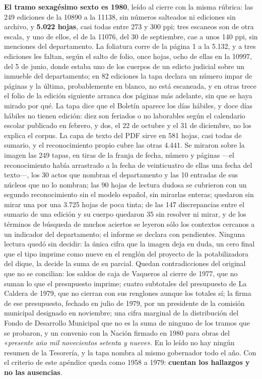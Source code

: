 \textbf{El tramo sexagésimo sexto es 1980}, leído al cierre con la misma rúbrica: las 249 ediciones de la 10890 a la 11138, sin números salteados ni ediciones sin archivo, y \textbf{5.022 hojas}, casi todas entre 273 y 300 ppi; tres escaneos son de otra escala, y uno de ellos, el de la 11076, del 30 de septiembre, cae a unos 140 ppi, sin menciones del departamento. La foliatura corre de la página 1 a la 5.132, y a tres ediciones les faltan, según el salto de folio, once hojas, ocho de ellas en la 10997, del 5 de junio, donde estaba uno de los cuerpos de un edicto judicial sobre un inmueble del departamento; en 82 ediciones la tapa declara un número impar de páginas y la última, probablemente en blanco, no está escaneada, y en otras trece el folio de la edición siguiente arranca dos páginas más adelante, sin que se haya mirado por qué. La tapa dice que el Boletín aparece los días hábiles, y doce días hábiles no tienen edición: diez son feriados o no laborables según el calendario escolar publicado en febrero, y dos, el 22 de octubre y el 31 de diciembre, no los explica el corpus. La capa de texto del PDF sirve en 581 hojas, casi todas de sumario, y el reconocimiento propio cubre las otras 4.441. Se miraron sobre la imagen las 249 tapas, en tiras de la franja de fecha, número y páginas ---el reconocimiento había arrastrado a la fecha de veinticuatro de ellas una fecha del texto---, los 30 actos que nombran el departamento y las 10 entradas de sus núcleos que no lo nombran; las 90 hojas de lectura dudosa se cubrieron con un segundo reconocimiento sin el modelo español, sin mirarlas enteras; quedaron sin mirar una por una 3.725 hojas de poca tinta; de las 147 discrepancias entre el sumario de una edición y su cuerpo quedaron 35 sin resolver ni mirar, y de los términos de búsqueda de muchos aciertos se leyeron sólo los contextos cercanos a un indicador del departamento; el informe se declara con pendientes. Ninguna lectura quedó sin decidir: la única cifra que la imagen deja en duda, un cero final que el tipo imprime como nueve en el renglón del proyecto de la potabilizadora del dique, la decide la suma de su parcial. Quedan contradicciones del original que no se concilian: los saldos de caja de Vaqueros al cierre de 1977, que no suman lo que el presupuesto imprime; cuatro subtotales del presupuesto de La Caldera de 1979, que no cierran con sus renglones aunque los totales sí; la firma de ese presupuesto, fechado en julio de 1979, por un presidente de la comisión municipal designado en noviembre; una cifra marginal de la distribución del Fondo de Desarrollo Municipal que no es la suma de ninguno de los tramos que se probaron, y un convenio con la Nación firmado en 1980 para obras del «\textit{presente año mil novecientos setenta y nueve}». En lo leído no hay ningún resumen de la Tesorería, y la tapa nombra al mismo gobernador todo el año. Con el criterio de este apéndice queda como 1958 a 1979: \textbf{cuentan los hallazgos y no las ausencias}.

